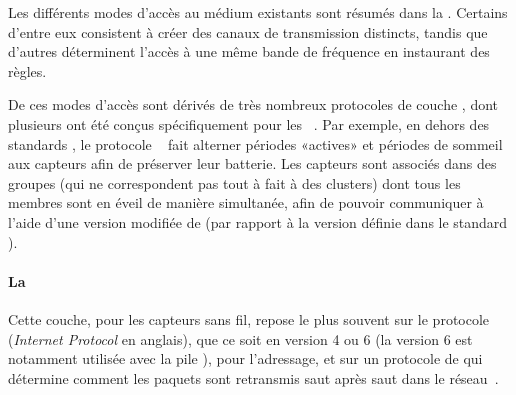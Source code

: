 Les différents modes d'accès au médium existants sont résumés dans la .
Certains d'entre eux consistent à créer des canaux de transmission distincts, tandis que d'autres déterminent l'accès à une même bande de fréquence en instaurant des règles.

De ces modes d'accès sont dérivés de très nombreux protocoles de couche \mac, dont plusieurs ont été conçus spécifiquement pour les \rcs~\cite{YB09}.
Par exemple, en dehors des standards \ieee, le protocole \smac~\cite{YHE02} fait alterner périodes «actives» et périodes de sommeil aux capteurs afin de préserver leur batterie.
Les capteurs sont associés dans des groupes (qui ne correspondent pas tout à fait à des clusters) dont tous les membres sont en éveil de manière simultanée, afin de pouvoir communiquer à l'aide d'une version modifiée de \csmaca (par rapport à la version définie dans le standard \ieeee).

            \paragraph{La }
Cette couche, pour les capteurs sans fil, repose le plus souvent sur le protocole \ip (\textit{Internet Protocol} en anglais), que ce soit en version 4 ou 6 (la version 6 est notamment utilisée avec la pile \slowpan), pour l'adressage, et sur un protocole de  qui détermine comment les paquets sont retransmis saut après saut dans le réseau~\cite{TW10}.

